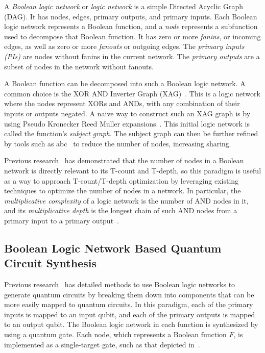 A {\it Boolean logic network} or {\it logic network} is a simple Directed Acyclic Graph (DAG).
It has nodes, edges, primary outputs, and primary inputs. Each Boolean logic network represents
a Boolean function, and a \emph{node} represents a subfunction used to decompose that Boolean
function. It has zero or more {\it fanins}, or incoming edges, as well as zero or more
{\it fanouts} or outgoing edges. The {\it primary inputs (PIs)} are nodes without fanins in
the current network. The {\it primary outputs} are a subset of nodes in the network without
fanouts.

A Boolean function can be decomposed into such a Boolean logic network. A common choice is the
XOR AND Inverter Graph (XAG)~\cite{bib-meuli-xag}. This is a logic network where the nodes represent
XORs and ANDs, with any combination of their inputs or outputs negated. A naive way to construct such
an XAG graph is by using Pseudo Kronecker Reed Muller expansions~\cite{bib-pkrm,bib-exorcism}.
This initial logic network is called the function's \emph{subject graph}. The subject graph can then be
further refined by tools such as abc~\cite{bib-mishchenko-lut} to reduce the number of nodes, increasing
sharing.

Previous research~\cite{bib-meuli-xag,bib-meuli-ros,bib-meuli-mult} has demonstrated that the
number of nodes in a Boolean network is directly relevant to its T-count and T-depth, so this paradigm
is useful as a way to approach T-count/T-depth optimization by leveraging existing techniques to
optimize the number of nodes in a network. In particular, the {\it multiplicative complexity} of a logic network
is the number of AND nodes in it, and its {\it multiplicative depth} is the longest chain of such AND nodes
from a primary input to a primary output~\cite{bib-meuli-xag}.

\subsection{Boolean Logic Network Based Quantum Circuit Synthesis}
\label{Subsec:lhrs}

Previous research~\cite{bib-lhrs-soeken,bib-meuli-xag} has detailed methods to use Boolean logic
networks to generate quantum circuits by breaking them down into components that can be more
easily mapped to quantum circuits. In this paradigm, each of the primary inputs is mapped to an
input qubit, and each of the primary outputs is mapped to an output qubit. The Boolean logic network
in each function is synthesized by using a quantum gate. Each node, which represents a Boolean
function $F$, is implemented as a single-target gate, such as that depicted in~.

